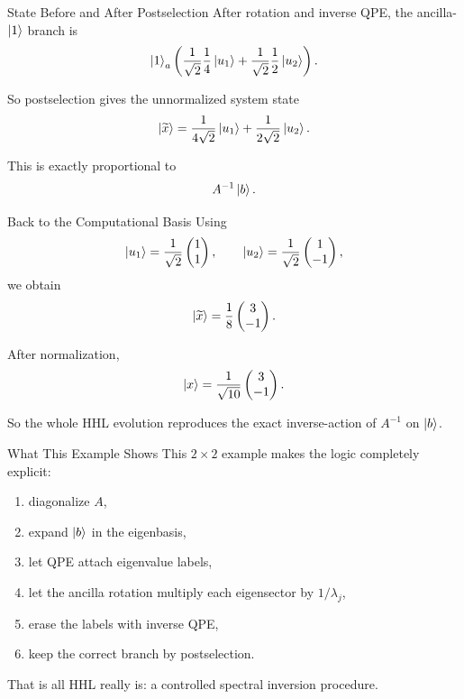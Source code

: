 \documentclass{beamer}
\begin{document}
\begin{frame}{State Before and After Postselection}
After rotation and inverse QPE, the ancilla-\(\ket{1}\) branch is
\[
\ket{1}_a
\left(
\frac{1}{\sqrt{2}}\frac{1}{4}\ket{u_1}
+
\frac{1}{\sqrt{2}}\frac{1}{2}\ket{u_2}
\right).
\]

So postselection gives the unnormalized system state
\[
\ket{\widetilde{x}}
=
\frac{1}{4\sqrt{2}}\ket{u_1}
+
\frac{1}{2\sqrt{2}}\ket{u_2}.
\]

This is exactly proportional to
\[
A^{-1}\ket{b}.
\]
\end{frame}

\begin{frame}{Back to the Computational Basis}
Using
\[
\ket{u_1}=\frac{1}{\sqrt{2}}
\begin{pmatrix}
1\\
1
\end{pmatrix},
\qquad
\ket{u_2}=\frac{1}{\sqrt{2}}
\begin{pmatrix}
1\\
-1
\end{pmatrix},
\]
we obtain
\[
\ket{\widetilde{x}}
=
\frac{1}{8}
\begin{pmatrix}
3\\
-1
\end{pmatrix}.
\]

After normalization,
\[
\ket{x}=\frac{1}{\sqrt{10}}
\begin{pmatrix}
3\\
-1
\end{pmatrix}.
\]

So the whole HHL evolution reproduces the exact inverse-action of \(A^{-1}\) on \(\ket{b}\).
\end{frame}

\begin{frame}{What This Example Shows}
This \(2\times 2\) example makes the logic completely explicit:

\begin{enumerate}
    \item diagonalize \(A\),
    \item expand \(\ket{b}\) in the eigenbasis,
    \item let QPE attach eigenvalue labels,
    \item let the ancilla rotation multiply each eigensector by \(1/\lambda_j\),
    \item erase the labels with inverse QPE,
    \item keep the correct branch by postselection.
\end{enumerate}

That is all HHL really is: a controlled spectral inversion procedure.
\end{frame}
\end{document}
